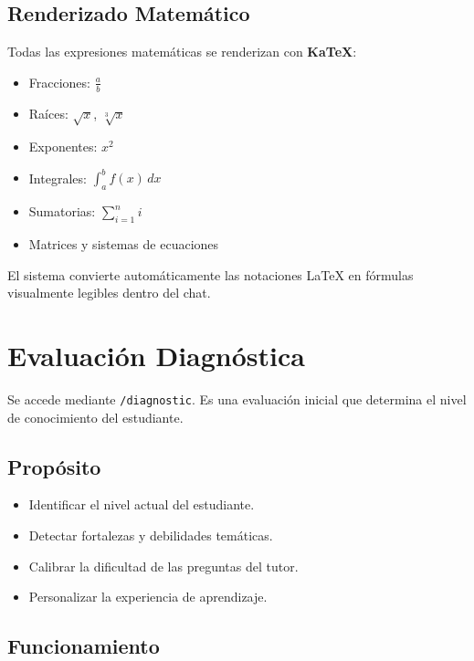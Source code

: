\documentclass[12pt, a4paper, oneside]{book}
\begin{document}
\section{Renderizado Matemático}

Todas las expresiones matemáticas se renderizan con \textbf{KaTeX}:
\begin{itemize}
    \item Fracciones: $\frac{a}{b}$
    \item Raíces: $\sqrt{x}$, $\sqrt[3]{x}$
    \item Exponentes: $x^{2}$
    \item Integrales: $\int_{a}^{b} f(x)\,dx$
    \item Sumatorias: $\sum_{i=1}^{n} i$
    \item Matrices y sistemas de ecuaciones
\end{itemize}

El sistema convierte automáticamente las notaciones LaTeX en fórmulas visualmente legibles dentro del chat.


\chapter{Evaluación Diagnóstica}

Se accede mediante \texttt{/diagnostic}. Es una evaluación inicial que determina el nivel de conocimiento del estudiante.

\section{Propósito}

\begin{itemize}
    \item Identificar el nivel actual del estudiante.
    \item Detectar fortalezas y debilidades temáticas.
    \item Calibrar la dificultad de las preguntas del tutor.
    \item Personalizar la experiencia de aprendizaje.
\end{itemize}

\section{Funcionamiento}
\end{document}
